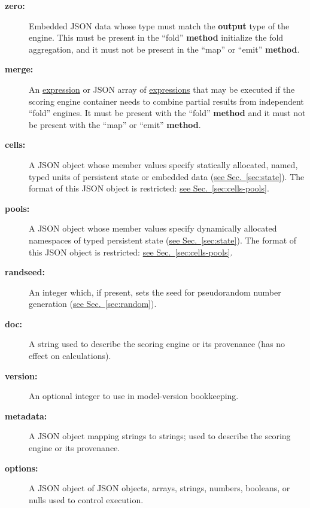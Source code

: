\documentclass{article}
\newcommand{\PFAc}{\ttfamily\bfseries}
\newenvironment{allowedfields}%
  {\begin{center} \begin{minipage}{0.9\linewidth} \begin{description}}%
  {\end{description} \end{minipage} \end{center}}
\theoremstyle{definition}
\begin{document}
\begin{allowedfields}
\item[\PFAc zero:] Embedded JSON data whose type must match the {\PFAc output} type of the engine.  This must be present in the ``fold'' {\PFAc method} initialize the fold aggregation, and it must not be present in the ``map'' or ``emit'' {\PFAc method}.
\end{allowedfields}
\begin{allowedfields}
\item[\PFAc merge:] An \hyperlink{hsec:expressions}{expression} or JSON array of \hyperlink{hsec:expressions}{expressions} that may be executed if the scoring engine container needs to combine partial results from independent ``fold'' engines.  It must be present with the ``fold'' {\PFAc method} and it must not be present with the ``map'' or ``emit'' {\PFAc method}.
\end{allowedfields}
\begin{allowedfields}
\item[\PFAc cells:] A JSON object whose member values specify statically allocated, named, typed units of persistent state or embedded data (\hyperlink{hsec:state}{see Sec.~\ref{sec:state}}).  The format of this JSON object is restricted: \hyperlink{hsec:cells-pools}{see Sec.~\ref{sec:cells-pools}}.
\end{allowedfields}
\begin{allowedfields}
\item[\PFAc pools:] A JSON object whose member values specify dynamically allocated namespaces of typed persistent state (\hyperlink{hsec:state}{see Sec.~\ref{sec:state}}).  The format of this JSON object is restricted: \hyperlink{hsec:cells-pools}{see Sec.~\ref{sec:cells-pools}}.
\end{allowedfields}
\begin{allowedfields}
\item[\PFAc randseed:] An integer which, if present, sets the seed for pseudorandom number generation (\hyperlink{hsec:method}{see Sec.~\ref{sec:random}}).
\end{allowedfields}
\begin{allowedfields}
\item[\PFAc doc:] A string used to describe the scoring engine or its provenance (has no effect on calculations).
\end{allowedfields}
\begin{allowedfields}
\item[\PFAc version:] An optional integer to use in model-version bookkeeping.
\end{allowedfields}
\begin{allowedfields}
\item[\PFAc metadata:] A JSON object mapping strings to strings; used to describe the scoring engine or its provenance.
\end{allowedfields}
\begin{allowedfields}
\item[\PFAc options:] A JSON object of JSON objects, arrays, strings, numbers, booleans, or nulls used to control execution.
\end{allowedfields}
\end{document}
